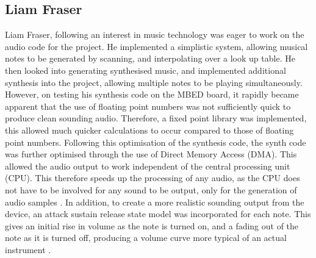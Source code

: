\subsection*{Liam Fraser}
Liam Fraser, following an interest in music technology was eager to work on the 
audio code for the project. He implemented a simplistic system, allowing musical 
notes to be generated by scanning, and interpolating over a look up table. He then 
looked into generating synthesised music, and implemented additional synthesis 
into the project, allowing multiple notes to be playing simultaneously. However, 
on testing his synthesis code on the MBED board, it rapidly became apparent that 
the use of floating point numbers was not sufficiently quick to produce clean 
sounding audio. Therefore, a fixed point library was implemented, this allowed 
much quicker calculations to occur compared to those of floating point numbers. 
Following this optimisation of the synthesis code, the synth code was further 
optimised through the use of Direct Memory Access (DMA). This allowed the audio 
output to work independent of the central processing unit (CPU). This 
therefore speeds up the processing of any audio, as the CPU does not have to be 
involved for any sound to be output, only for the generation of audio samples 
\cite{dma-book}. In addition, to create a more realistic sounding output from the 
device, an attack sustain release state model was incorporated for each note. 
This gives an initial rise in volume as the note is turned on, and a fading out 
of the note as it is turned off, producing a volume curve more typical of an 
actual instrument \cite{asr-book}.

